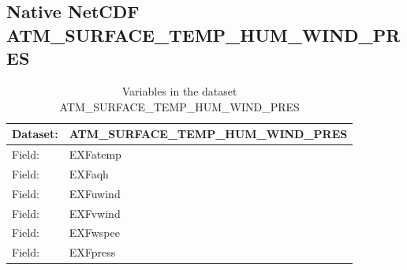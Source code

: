 \pagebreak
\subsection{Native NetCDF ATM\_SURFACE\_TEMP\_HUM\_WIND\_PRES}
\newp
\begin{longtable}{|p{}|p{}|}
\caption{Variables in the dataset ATM\_SURFACE\_TEMP\_HUM\_WIND\_PRES}
\label{tab:table-ATM_SURFACE_TEMP_HUM_WIND_PRES-fields} \\ 
\hline \endhead \hline \endfoot
\rowcolor{lightgray} \textbf{Dataset:} & \textbf{ATM\_SURFACE\_TEMP\_HUM\_WIND\_PRES} \\ \hline
Field: &EXFatemp \\ \hline
Field: &EXFaqh \\ \hline
Field: &EXFuwind \\ \hline
Field: &EXFvwind \\ \hline
Field: &EXFwspee \\ \hline
Field: &EXFpress \\ \hline
\end{longtable}

\pagebreak
